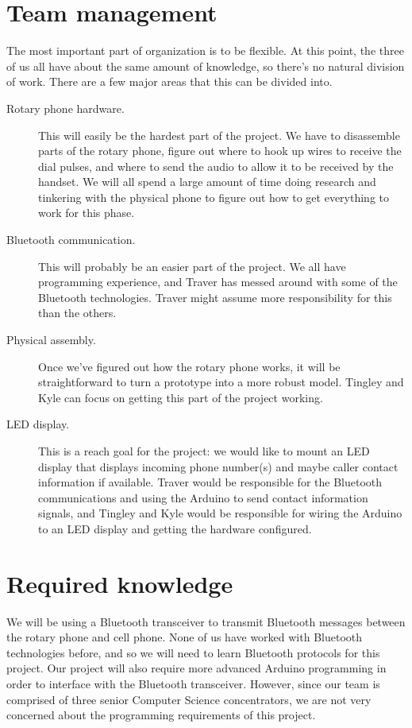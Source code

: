 \documentclass[11pt]{article}
\begin{document}
    \section{Team management}
        The most important part of organization is to be flexible. At this point, the three of us all have about the same amount of knowledge, so there's no natural division of work. There are a few major areas that this can be divided into.
        \begin{description}
            \item[Rotary phone hardware.]
                This will easily be the hardest part of the project. We have to disassemble parts of the rotary phone, figure out where to hook up wires to receive the dial pulses, and where to send the audio to allow it to be received by the handset. We will all spend a large amount of time doing research and tinkering with the physical phone to figure out how to get everything to work for this phase.
            \item[Bluetooth communication.]
                This will probably be an easier part of the project. We all have programming experience, and Traver has messed around with some of the Bluetooth technologies. Traver might assume more responsibility for this than the others.
            \item[Physical assembly.]
                Once we've figured out how the rotary phone works, it will be straightforward to turn a prototype into a more robust model. Tingley and Kyle can focus on getting this part of the project working.
            \item[LED display.]
                This is a reach goal for the project: we would like to mount an LED display that displays incoming phone number(s) and maybe caller contact information if available. Traver would be responsible for the Bluetooth communications and using the Arduino to send contact information signals, and Tingley and Kyle would be responsible for wiring the Arduino to an LED display and getting the hardware configured.
        \end{description}

    \section{Required knowledge}
        We will be using a Bluetooth transceiver to transmit Bluetooth messages between the rotary phone and cell phone. None of us have worked with Bluetooth technologies before, and so we will need to learn Bluetooth protocols for this project. Our project will also require more advanced Arduino programming in order to interface with the Bluetooth transceiver. However, since our team is comprised of three senior Computer Science concentrators, we are not very concerned about the programming requirements of this project.
\end{document}
